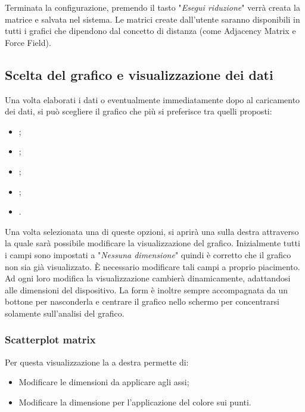 Terminata la configurazione, premendo il tasto "\textit{Esegui riduzione}" verrà creata la matrice e salvata nel sistema. Le matrici create dall'utente saranno disponibili in tutti i grafici che dipendono dal concetto di distanza (come Adjacency Matrix e Force Field).

\newpage
\subsection{Scelta del grafico e visualizzazione dei dati}
Una volta elaborati i dati o eventualmente immediatamente dopo al caricamento dei dati, si può scegliere il grafico che più si preferisce tra quelli proposti:
\begin{itemize}
	\item {};
	\item {};
	\item {};
	\item {};
	\item {}.
\end{itemize}

Una volta selezionata una di queste opzioni, si aprirà una  sulla destra attraverso la quale sarà possibile modificare la visualizzazione del grafico. Inizialmente tutti i campi sono impostati a "\textit{Nessuna dimensione}" quindi è corretto che il grafico non sia già visualizzato. È necessario modificare tali campi a proprio piacimento. Ad ogni loro modifica la visualizzazione cambierà dinamicamente, adattandosi alle dimensioni del dispositivo. La form è inoltre sempre accompagnata da un bottone per nasconderla e centrare il grafico nello schermo per concentrarsi solamente sull'analisi del grafico. 

\newpage

\subsubsection{Scatterplot matrix}

Per questa visualizzazione la  a destra permette di:
\begin{itemize}
	\item Modificare le dimensioni da applicare agli assi;
	\item Modificare la dimensione per l'applicazione del colore sui punti.
\end{itemize} 

